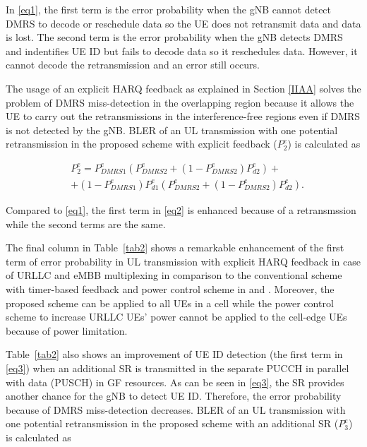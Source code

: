 \documentclass[conference]{IEEEtran}
\begin{document}
In \eqref{eq1}, the first term is the error probability when the gNB cannot detect DMRS to decode or reschedule data so the UE does not retransmit data and data is lost. The second term is the error probability when the gNB detects DMRS and indentifies UE ID but fails to decode data so it reschedules data. However, it cannot decode the retransmission and an error still occurs.

The usage of an explicit HARQ feedback as explained in Section \ref{IIAA} solves the problem of DMRS miss-detection in the overlapping region because it allows the UE to carry out the retransmissions in the interference-free regions even if DMRS is not detected by the gNB. BLER of an UL transmission with one potential retransmission in the proposed scheme with explicit feedback ($ P^{e}_{2}$) is calculated as\useshortskip

\begin{equation}
\begin{split}
 &P^{e}_{2} = P^{e}_{DMRS1}(P^{e}_{DMRS2} + (1-P^{e}_{DMRS2})P^{e}_{d2}) + \\
        &+ (1-P^{e}_{DMRS1})P^{e}_{d1}(P^{e}_{DMRS2} + (1-P^{e}_{DMRS2})P^{e}_{d2}).\label{eq2}   
\end{split}
\end{equation}

Compared to \eqref{eq1}, the first term in \eqref{eq2} is enhanced because of a retransmssion while the second terms are the same.

The final column in Table~\ref{tab2} shows a remarkable enhancement of the first term of error probability in UL transmission with explicit HARQ feedback in case of URLLC and eMBB multiplexing in comparison to the conventional scheme with timer-based feedback and power control scheme in \cite{b2} and \cite{b3}. Moreover, the proposed scheme can be applied to all UEs in a cell while the power control scheme to increase URLLC UEs' power cannot be applied to the cell-edge UEs because of power limitation. 

Table~\ref{tab2} also shows an improvement of UE ID detection (the first term in \eqref{eq3}) when an additional SR is transmitted in the separate PUCCH in parallel with data (PUSCH) in GF resources. As can be seen in \eqref{eq3}, the SR provides another chance for the gNB to detect UE ID. Therefore, the error probability because of DMRS miss-detection decreases. BLER of an UL transmission with one potential retransmission in the proposed scheme with an additional SR ($ P^{e}_{3}$) is calculated as\useshortskip
\end{document}
